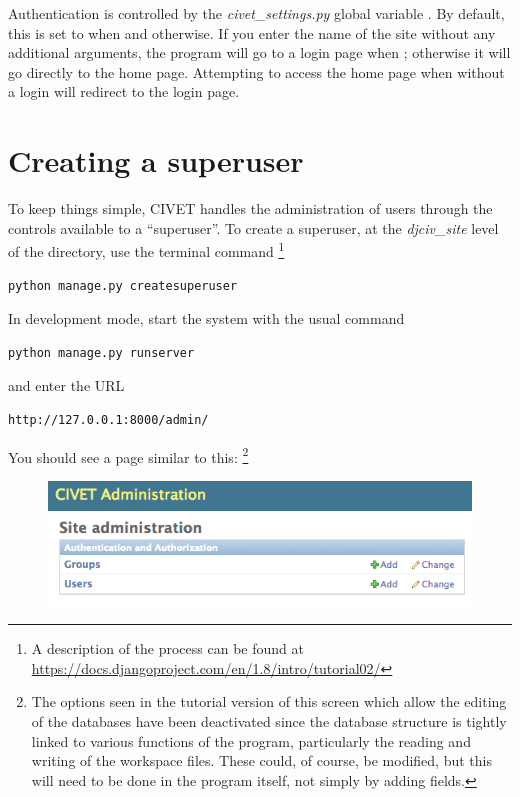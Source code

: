 \documentclass[letterpaper,10pt,english]{sphinxmanual}
\begin{document}
Authentication is controlled by the \emph{civet\_settings.py} global variable . By default, this is set to
 when  and  otherwise. If you enter the name of the site without any additional
arguments, the program will go to a login page when ; otherwise it will go
directly to the home page.
Attempting to access the home page when  without a login will redirect to the login page.


\section{Creating a superuser}
\label{authentication:creating-a-superuser}
To keep things simple, CIVET handles the administration of users through the controls available to a “superuser”.
To create a superuser, at the \emph{djciv\_site} level of the directory, use the terminal command \footnote{
A description of the process can be found at \href{https://docs.djangoproject.com/en/1.8/intro/tutorial02/}{https://docs.djangoproject.com/en/1.8/intro/tutorial02/}
}

\begin{Verbatim}[commandchars=\\\{\}]
python manage.py createsuperuser
\end{Verbatim}

In development mode, start the system with the usual command

\begin{Verbatim}[commandchars=\\\{\}]
python manage.py runserver
\end{Verbatim}

and enter the URL

\begin{Verbatim}[commandchars=\\\{\}]
http://127.0.0.1:8000/admin/
\end{Verbatim}

You should see a page similar to this: \footnote{
The options seen in the tutorial version of this screen which allow the editing of the databases have been deactivated
since the database structure is tightly linked to various functions of the program, particularly the reading and
writing of the workspace files. These could, of course, be modified, but this will need to be done in the program
itself, not simply by adding fields.
}
\begin{figure}[htbp]
\centering

\includegraphics{adminpage.png}
\end{figure}
\end{document}

